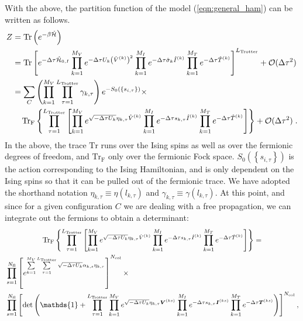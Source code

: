 With the above, the partition function of the model (\ref{eqn:general_ham}) can be written as follows.
\begin{align}\label{eqn:partition_1}
Z &= \mathop{\mathrm{Tr}}{\left(e^{-\beta \hat{\mathcal{H}} }\right)}\nonumber\\
  &=   \mathop{\mathrm{Tr}}{  \left[ e^{-\Delta \tau \hat{\mathcal{H}}_{0,I}}  
    \prod_{k=1}^{M_V}   e^{ - \Delta \tau  U_k \left(  \hat{V}^{(k)} \right)^2}   \prod_{k=1}^{M_I}   e^{  -\Delta \tau  \hat{\sigma}_{k}  \hat{I}^{(k)}} 
     \prod_{k=1}^{M_T}   e^{-\Delta \tau \hat{T}^{(k)}}  
   \right]^{L_{\text{Trotter}}}}  + \mathcal{O}(\Delta\tau^{2})\nonumber \\
   &=
   \sum_{C} \left( \prod_{k=1}^{M_V} \prod_{\tau=1}^{L_{\mathrm{Trotter}}} \gamma_{k,\tau} \right) e^{-S_0 \left( \left\{ s_{i,\tau} \right\}  \right) }\times \nonumber\\
   &\quad
    \mathop{\mathrm{Tr}_{\mathrm{F}}}{ \left\{  \prod_{\tau=1}^{L_{\mathrm{Trotter}}} \left[  
    \prod_{k=1}^{M_V}   e^{  \sqrt{ -\Delta \tau  U_k} \eta_{k,\tau} \hat{V}^{(k)} }   \prod_{k=1}^{M_I}   e^{  -\Delta \tau s_{k,\tau}  \hat{I}^{(k)}}  
      \prod_{k=1}^{M_T}   e^{-\Delta \tau \hat{T}^{(k)}}    \right]\right\} }+ \mathcal{O}(\Delta\tau^{2})\;.
\end{align}
In the above,  the trace $\mathrm{Tr} $  runs over the Ising spins as well as over the fermionic degrees of freedom, and $ \mathrm{Tr}_{\mathrm{F}}  $ only over the  fermionic Fock space. 
$S_0 \left( \left\{ s_{i,\tau} \right\}  \right)  $ is the action  corresponding to the Ising Hamiltonian,  and is only dependent on the Ising spins so that  it can be pulled out of the fermionic trace.  We have adopted the shorthand notation $\eta_{k,\tau} \equiv \eta(l_{k,\tau})$   and $\gamma_{k,\tau} \equiv \gamma(l_{k,\tau})$.
At this point,  and  since for a given configuration $C$  we are dealing with a free propagation, we can integrate out the fermions to obtain a determinant: 
\begin{multline}
\Trf{ \left\{  \prod_{\tau=1}^{L_{\mathrm{Trotter}}} \left[    
    \prod_{k=1}^{M_V}   e^{  \sqrt{ - \Delta \tau  U_k} \eta_{k,\tau} \hat{V}^{(k)} }   \prod_{k=1}^{M_I}   e^{  -\Delta \tau s_{k,\tau}  \hat{I}^{(k)}} 
    \prod_{k=1}^{M_T}   e^{-\Delta \tau \hat{T}^{(k)}}   \right]   \right\}} = \\
\begin{aligned}
&\prod\limits_{s=1}^{N_{\mathrm{fl}}} \left[  e^{\sum\limits_{k=1}^{M_V} \sum\limits_{\tau = 1}^{L_{\mathrm{Trotter}}}\sqrt{-\Delta \tau U_k}  \alpha_{k,s} \eta_{k,\tau} } \right]^{N_{\mathrm{col}}} \times \\
&\prod\limits_{s=1}^{N_{\mathrm{fl}}} 
   \left[
    \det\left(  \mathds{1} + 
     \prod_{\tau=1}^{L_{\mathrm{Trotter}}}   
    \prod_{k=1}^{M_V}   e^{  \sqrt{ -\Delta \tau  U_k} \eta_{k,\tau} {\bm V}^{(ks)} }   \prod_{k=1}^{M_I}   e^{  -\Delta \tau s_{k,\tau}  {\bm I}^{(ks)}}  
      \prod_{k=1}^{M_T}   e^{-\Delta \tau \bm{T}^{(ks)}}   \right) \right]^{N_{\mathrm{col}}},
\end{aligned}
\end{multline}
